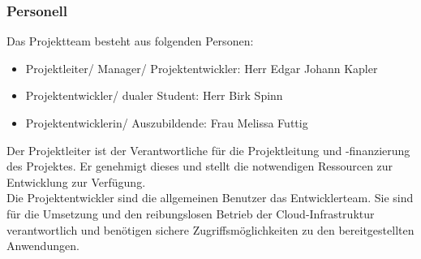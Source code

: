 \subsubsection{Personell}
\label{sec:Personell}
Das Projektteam besteht aus folgenden Personen:
\begin{itemize} [label=--]
	\item Projektleiter/ Manager/ Projektentwickler: Herr Edgar Johann Kapler
	\item Projektentwickler/ dualer Student: Herr Birk Spinn
	\item Projektentwicklerin/ Auszubildende: Frau Melissa Futtig
\end{itemize}
Der Projektleiter ist der Verantwortliche für die Projektleitung und -finanzierung des Projektes. 
Er genehmigt dieses und stellt die notwendigen Ressourcen zur Entwicklung zur Verfügung.
\\Die Projektentwickler sind die allgemeinen Benutzer \bzw das Entwicklerteam. Sie sind für die Umsetzung und den 
reibungslosen Betrieb der Cloud-Infrastruktur verantwortlich und benötigen sichere Zugriffsmöglichkeiten zu den 
bereitgestellten Anwendungen.